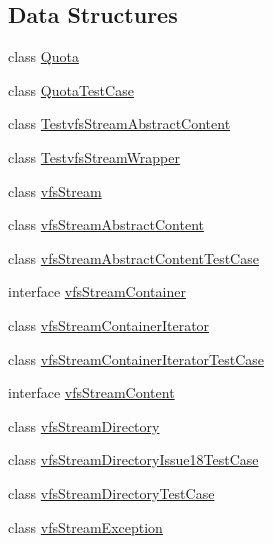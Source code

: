 \subsection*{Data Structures}
\begin{DoxyCompactItemize}
\item 
class \mbox{\hyperlink{classorg_1_1bovigo_1_1vfs_1_1_quota}{Quota}}
\item 
class \mbox{\hyperlink{classorg_1_1bovigo_1_1vfs_1_1_quota_test_case}{Quota\+Test\+Case}}
\item 
class \mbox{\hyperlink{classorg_1_1bovigo_1_1vfs_1_1_testvfs_stream_abstract_content}{Testvfs\+Stream\+Abstract\+Content}}
\item 
class \mbox{\hyperlink{classorg_1_1bovigo_1_1vfs_1_1_testvfs_stream_wrapper}{Testvfs\+Stream\+Wrapper}}
\item 
class \mbox{\hyperlink{classorg_1_1bovigo_1_1vfs_1_1vfs_stream}{vfs\+Stream}}
\item 
class \mbox{\hyperlink{classorg_1_1bovigo_1_1vfs_1_1vfs_stream_abstract_content}{vfs\+Stream\+Abstract\+Content}}
\item 
class \mbox{\hyperlink{classorg_1_1bovigo_1_1vfs_1_1vfs_stream_abstract_content_test_case}{vfs\+Stream\+Abstract\+Content\+Test\+Case}}
\item 
interface \mbox{\hyperlink{interfaceorg_1_1bovigo_1_1vfs_1_1vfs_stream_container}{vfs\+Stream\+Container}}
\item 
class \mbox{\hyperlink{classorg_1_1bovigo_1_1vfs_1_1vfs_stream_container_iterator}{vfs\+Stream\+Container\+Iterator}}
\item 
class \mbox{\hyperlink{classorg_1_1bovigo_1_1vfs_1_1vfs_stream_container_iterator_test_case}{vfs\+Stream\+Container\+Iterator\+Test\+Case}}
\item 
interface \mbox{\hyperlink{interfaceorg_1_1bovigo_1_1vfs_1_1vfs_stream_content}{vfs\+Stream\+Content}}
\item 
class \mbox{\hyperlink{classorg_1_1bovigo_1_1vfs_1_1vfs_stream_directory}{vfs\+Stream\+Directory}}
\item 
class \mbox{\hyperlink{classorg_1_1bovigo_1_1vfs_1_1vfs_stream_directory_issue18_test_case}{vfs\+Stream\+Directory\+Issue18\+Test\+Case}}
\item 
class \mbox{\hyperlink{classorg_1_1bovigo_1_1vfs_1_1vfs_stream_directory_test_case}{vfs\+Stream\+Directory\+Test\+Case}}
\item 
class \mbox{\hyperlink{classorg_1_1bovigo_1_1vfs_1_1vfs_stream_exception}{vfs\+Stream\+Exception}}

\end{DoxyCompactItemize}
